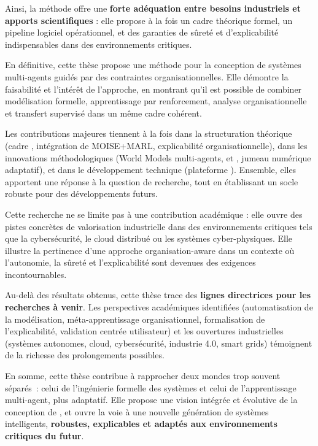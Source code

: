 \medskip
\noindent
Ainsi, la méthode  offre une \textbf{forte adéquation entre besoins industriels et apports scientifiques} :
elle propose à la fois un cadre théorique formel, un pipeline logiciel opérationnel, et des garanties de sûreté et d’explicabilité indispensables dans des environnements critiques.

\bigskip
\noindent
En définitive, cette thèse propose une méthode pour la conception de systèmes multi-agents guidés par des contraintes organisationnelles.
Elle démontre la faisabilité et l’intérêt de l’approche, en montrant qu’il est possible de combiner modélisation formelle, apprentissage par renforcement, analyse organisationnelle et transfert supervisé dans un même cadre cohérent.

\medskip
\noindent
Les contributions majeures tiennent à la fois dans la structuration théorique (cadre , intégration de MOISE+MARL, explicabilité organisationnelle), dans les innovations méthodologiques (World Models multi-agents,  et , jumeau numérique adaptatif), et dans le développement technique (plateforme ).
Ensemble, elles apportent une réponse à la question de recherche, tout en établissant un socle robuste pour des développements futurs.

\medskip
\noindent
Cette recherche ne se limite pas à une contribution académique : elle ouvre des pistes concrètes de valorisation industrielle dans des environnements critiques tels que la cybersécurité, le cloud distribué ou les systèmes cyber-physiques.
Elle illustre la pertinence d’une approche organisation-aware dans un contexte où l’autonomie, la sûreté et l’explicabilité sont devenues des exigences incontournables.

\medskip
\noindent
Au-delà des résultats obtenus, cette thèse trace des \textbf{lignes directrices pour les recherches à venir}.
Les perspectives académiques identifiées (automatisation de la modélisation, méta-apprentissage organisationnel, formalisation de l’explicabilité, validation centrée utilisateur) et les ouvertures industrielles (systèmes autonomes, cloud, cybersécurité, industrie 4.0, smart grids) témoignent de la richesse des prolongements possibles.

\medskip
\noindent
En somme, cette thèse contribue à rapprocher deux mondes trop souvent séparés~: celui de l’ingénierie formelle des systèmes et celui de l’apprentissage multi-agent, plus adaptatif.
Elle propose une vision intégrée et évolutive de la conception de , et ouvre la voie à une nouvelle génération de systèmes intelligents, \textbf{robustes, explicables et adaptés aux environnements critiques du futur}.



\clearpage
\thispagestyle{empty}
\null
\newpage
